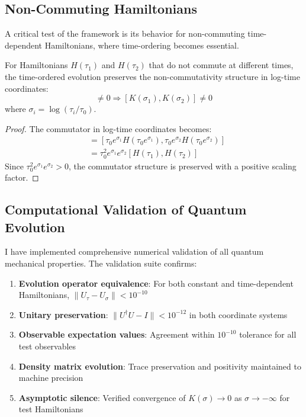 \subsection{Non-Commuting Hamiltonians}
\label{subsec:noncommuting_hamiltonians}

A critical test of the framework is its behavior for non-commuting time-dependent Hamiltonians, where time-ordering becomes essential.

\begin{theorem}
\label{thm:noncommuting_evolution}
For Hamiltonians $H(\tau_1)$ and $H(\tau_2)$ that do not commute at different times, the time-ordered evolution preserves the non-commutativity structure in log-time coordinates:
\begin{equation}
[H(\tau_1), H(\tau_2)] \neq 0 \Rightarrow [K(\sigma_1), K(\sigma_2)] \neq 0
\end{equation}
where $\sigma_i = \log(\tau_i/\tau_0)$.
\end{theorem}

\begin{proof}
The commutator in log-time coordinates becomes:
\begin{align}
[K(\sigma_1), K(\sigma_2)] &= [\tau_0 e^{\sigma_1} H(\tau_0 e^{\sigma_1}), \tau_0 e^{\sigma_2} H(\tau_0 e^{\sigma_2})] \\
&= \tau_0^2 e^{\sigma_1} e^{\sigma_2} [H(\tau_1), H(\tau_2)]
\end{align}
Since $\tau_0^2 e^{\sigma_1} e^{\sigma_2} > 0$, the commutator structure is preserved with a positive scaling factor.
\end{proof}

\subsection{Computational Validation of Quantum Evolution}
\label{subsec:computational_validation_quantum}

I have implemented comprehensive numerical validation of all quantum mechanical properties. The validation suite confirms:

\begin{enumerate}
\item \textbf{Evolution operator equivalence}: For both constant and time-dependent Hamiltonians, $\|U_\tau - U_\sigma\| < 10^{-10}$
\item \textbf{Unitary preservation}: $\|U^\dagger U - I\| < 10^{-12}$ in both coordinate systems
\item \textbf{Observable expectation values}: Agreement within $10^{-10}$ tolerance for all test observables
\item \textbf{Density matrix evolution}: Trace preservation and positivity maintained to machine precision
\item \textbf{Asymptotic silence}: Verified convergence of $K(\sigma) \to 0$ as $\sigma \to -\infty$ for test Hamiltonians
\end{enumerate}


